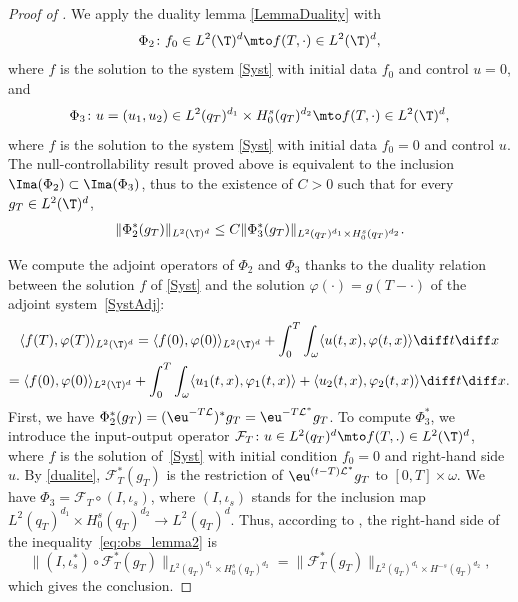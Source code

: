 \begin{proof}[Proof of ]
We apply the duality lemma \ref{LemmaDuality} with
\[
\Phi_2 \colon f_0 \in L^2(\T)^d \mto f(T,\cdot) \in L^2(\T)^d,
\]
where $f$ is the solution to the system \eqref{Syst} with initial data $f_0$ and control $u=0$, and
\[
\Phi_3 \colon u=(u_1,u_2) \in L^2(q_T)^{d_1} \times H_0^{s}(q_T)^{d_2} \mto f(T,\cdot) \in L^2(\T)^d,
\]
where $f$ is the solution to the system \eqref{Syst} with initial data $f_0=0$ and control $u$.
The null-controllability result proved above is equivalent to the inclusion $\Ima(\Phi_2)\subset \Ima(\Phi_3)$, thus to the existence of $C>0$ such that for every $g_T\in L^2(\T)^d$,
\begin{equation}\label{eq:obs_lemma2}
\lVert\Phi_2^*(g_T)\rVert_{L^2(\T)^d}\leq C\lVert \Phi_3^*(g_T)\rVert_{L^2(q_T)^{d_1}\times H^s_0(q_T)^{d_2}}.
\end{equation}

We compute the adjoint operators of $\Phi_2$ and $\Phi_3$ thanks to the duality relation between the solution $f$ of \eqref{Syst} and the solution $\varphi(\cdot)= g(T-\cdot)$ of the adjoint system~\eqref{SystAdj}:\vspace*{-5pt}
\begin{multline} \label{dualite}
\langle f(T), \varphi(T) \rangle_{L^2(\T)^d} = \langle f(0), \varphi(0) \rangle_{L^2(\T)^d} + \int_{0}^{T}\int_{\omega} \langle u(t,x), \varphi(t,x) \rangle \diff t \diff x \\
= \langle f(0), \varphi(0) \rangle_{L^2(\T)^d} + \int_{0}^{T}\int_{\omega} \langle u_1(t,x), \varphi_1(t,x) \rangle + \langle u_2(t,x), \varphi_2(t,x) \rangle \diff t \diff x.
\end{multline}
First, we have $\Phi_2^*(g_T) = (\eu^{-T\mathcal L})^* g_T = \eu^{-T\mathcal L^*}g_T$.
To compute $\Phi_3^*$, we introduce the input-output operator $\mathcal F_T \colon u \in L^2(q_T)^d \mto f(T,.) \in L^2(\T)^d$, where $f$ is the solution of~\eqref{Syst} with initial condition $f_0 = 0$ and right-hand side $u$. By \eqref{dualite}, $\mathcal F_T^*(g_T)$ is the restriction of $\eu^{(t-T)\mathcal L^*}g_T$ to $[0,T]\times \omega$.
We have $\Phi_3 = \mathcal F_T \circ (I,\iota_s)$, where $(I,\iota_s)$ stands for the inclusion map $L^2(q_T)^{d_1}\times H^s_0(q_T)^{d_2}\to L^2(q_T)^d$. Thus, according to , the right-hand side of the inequality~\eqref{eq:obs_lemma2} is
\[
\lVert (I,\iota_s^*) \circ \mathcal F_T^* (g_T)\rVert_{L^2(q_T)^{d_1}\times H^s_0(q_T)^{d_2}} = \lVert \mathcal F_T^* (g_T)\rVert_{L^2(q_T)^{d_1}\times H^{-s}(q_T)^{d_2}},
\]
which gives the conclusion.
\end{proof}

